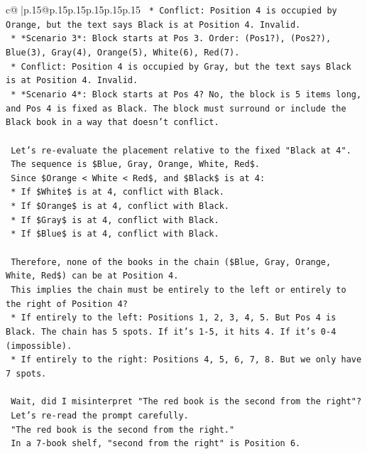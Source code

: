 \documentclass{article}
\begin{document}
{\begin{supertabular}{c@{$\;$}|p{.15\linewidth}@{}p{.15\linewidth}p{.15\linewidth}p{.15\linewidth}p{.15\linewidth}p{.15\linewidth}}
{{{\texttt{            *   Conflict: Position 4 is occupied by Orange, but the text says Black is at Position 4. Invalid.} \\
\texttt{        *   *Scenario 3*: Block starts at Pos 3. Order: (Pos1?), (Pos2?), Blue(3), Gray(4), Orange(5), White(6), Red(7).} \\
\texttt{            *   Conflict: Position 4 is occupied by Gray, but the text says Black is at Position 4. Invalid.} \\
\texttt{        *   *Scenario 4*: Block starts at Pos 4? No, the block is 5 items long, and Pos 4 is fixed as Black. The block must surround or include the Black book in a way that doesn't conflict.} \\
\\ 
\texttt{    Let's re{-}evaluate the placement relative to the fixed "Black at 4".} \\
\texttt{    The sequence is \$Blue, Gray, Orange, White, Red\$.} \\
\texttt{    Since \$Orange < White < Red\$, and \$Black\$ is at 4:} \\
\texttt{    *   If \$White\$ is at 4, conflict with Black.} \\
\texttt{    *   If \$Orange\$ is at 4, conflict with Black.} \\
\texttt{    *   If \$Gray\$ is at 4, conflict with Black.} \\
\texttt{    *   If \$Blue\$ is at 4, conflict with Black.} \\
\\ 
\texttt{    Therefore, none of the books in the chain (\$Blue, Gray, Orange, White, Red\$) can be at Position 4.} \\
\texttt{    This implies the chain must be entirely to the left or entirely to the right of Position 4?} \\
\texttt{    *   If entirely to the left: Positions 1, 2, 3, 4, 5. But Pos 4 is Black. The chain has 5 spots. If it's 1{-}5, it hits 4. If it's 0{-}4 (impossible).} \\
\texttt{    *   If entirely to the right: Positions 4, 5, 6, 7, 8. But we only have 7 spots.} \\
\\ 
\texttt{    Wait, did I misinterpret "The red book is the second from the right"?} \\
\texttt{    Let's re{-}read the prompt carefully.} \\
\texttt{    "The red book is the second from the right."} \\
\texttt{    In a 7{-}book shelf, "second from the right" is Position 6.} \\
}}}
\end{supertabular}}
\end{document}
